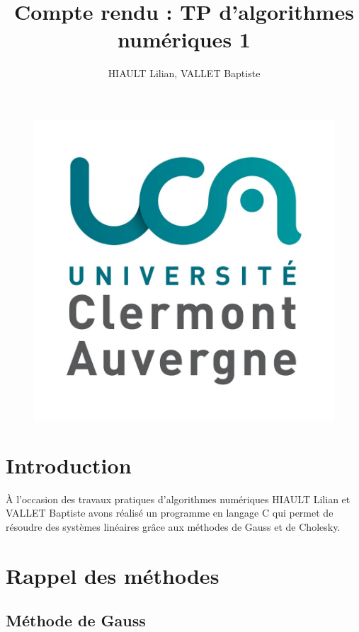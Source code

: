 \documentclass{article}
\title{Compte rendu : TP d'algorithmes numériques 1}
\author{HIAULT Lilian, VALLET Baptiste}
\date{}
\begin{document}
\begin{figure}[t]
 \centerline{\includegraphics[scale=0.1]{logoUCA.jpg}}
\end{figure}

\maketitle

\tableofcontents

\section*{Introduction}

À l'occasion des travaux pratiques d'algorithmes numériques HIAULT Lilian et VALLET Baptiste avons réalisé un programme en langage C qui permet de résoudre des systèmes linéaires grâce aux méthodes de Gauss et de Cholesky.


\section{Rappel des méthodes}

\subsection{Méthode de Gauss}
\end{document}
